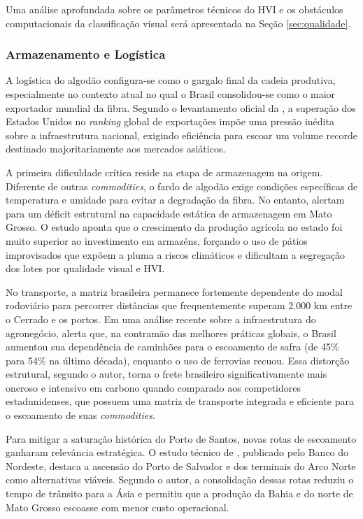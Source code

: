         Uma análise aprofundada sobre os parâmetros técnicos do HVI e os obstáculos computacionais da classificação visual será apresentada na Seção \ref{sec:qualidade}.

    \subsubsection{Armazenamento e Logística}

        A logística do algodão configura-se como o gargalo final da cadeia produtiva, especialmente no contexto atual no qual o Brasil consolidou-se como o maior exportador mundial da fibra. Segundo o levantamento oficial da , a superação dos Estados Unidos no \textit{ranking} global de exportações impõe uma pressão inédita sobre a infraestrutura nacional, exigindo eficiência para escoar um volume recorde destinado majoritariamente aos mercados asiáticos.

        A primeira dificuldade crítica reside na etapa de armazenagem na origem. Diferente de outras \textit{commodities}, o fardo de algodão exige condições específicas de temperatura e umidade para evitar a degradação da fibra. No entanto,  alertam para um déficit estrutural na capacidade estática de armazenagem em Mato Grosso. O estudo aponta que o crescimento da produção agrícola no estado foi muito superior ao investimento em armazéns, forçando o uso de pátios improvisados que expõem a pluma a riscos climáticos e dificultam a segregação dos lotes por qualidade visual e HVI.

        No transporte, a matriz brasileira permanece fortemente dependente do modal rodoviário para percorrer distâncias que frequentemente superam 2.000 km entre o Cerrado e os portos. Em uma análise recente sobre a infraestrutura do agronegócio,  alerta que, na contramão das melhores práticas globais, o Brasil aumentou sua dependência de caminhões para o escoamento de safra (de 45\% para 54\% na última década), enquanto o uso de ferrovias recuou. Essa distorção estrutural, segundo o autor, torna o frete brasileiro significativamente mais oneroso e intensivo em carbono quando comparado aos competidores estadunidenses, que possuem uma matriz de transporte integrada e eficiente para o escoamento de suas \textit{commodities}.

        Para mitigar a saturação histórica do Porto de Santos, novas rotas de escoamento ganharam relevância estratégica. O estudo técnico de , publicado pelo Banco do Nordeste, destaca a ascensão do Porto de Salvador e dos terminais do Arco Norte como alternativas viáveis. Segundo o autor, a consolidação dessas rotas reduziu o tempo de trânsito para a Ásia e permitiu que a produção da Bahia e do norte de Mato Grosso escoasse com menor custo operacional.

